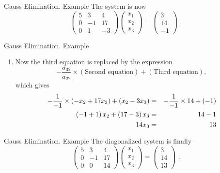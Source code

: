 \documentclass[11pt]{beamer}
\begin{document}
\begin{frame}[fragile]{Gauss Elimination. Example}
The system is now 
\begin{equation}
\begin{pmatrix}
5&3&4\\
0&-1&17\\
0&1&-3
\end{pmatrix}
\begin{pmatrix} 
x_1\\ x_2\\ x_3  
\end{pmatrix}
= \begin{pmatrix}3\\ 14 \\ -1\end{pmatrix}\,\,.
\end{equation}
\end{frame}

\begin{frame}[fragile]{Gauss Elimination. Example}
\begin{enumerate}\addtocounter{enumi}{2}
\item Now the third equation is replaced by the expression
\begin{equation}
-\frac{a_{32}}{a_{22}} \times (\text{Second equation}) + (\text{Third equation}),
\end{equation}
which gives
\begin{eqnarray}
-\frac{1}{-1} \times \left( - x_2 + 17 x_3 \right) + (x_2 -3x_3) &=& -\frac{1}{-1} \times 14 +(-1) \notag \\
\left(-1 + 1 \right)x_2  + \left(17 - 3 \right)x_3 &=& 14 -1 \notag \\
14 x_3 &=& 13 
\end{eqnarray}
\end{enumerate}
\end{frame}

\begin{frame}[fragile]{Gauss Elimination. Example}
The  diagonalized system is finally 
\begin{equation}
\begin{pmatrix}
5&3&4\\
0&-1&17\\
0&0&14
\end{pmatrix}
\begin{pmatrix} 
x_1\\ x_2\\ x_3  
\end{pmatrix}
= \begin{pmatrix}3\\ 14 \\ 13\end{pmatrix}\,\,.
\end{equation}
\end{frame}
\end{document}
